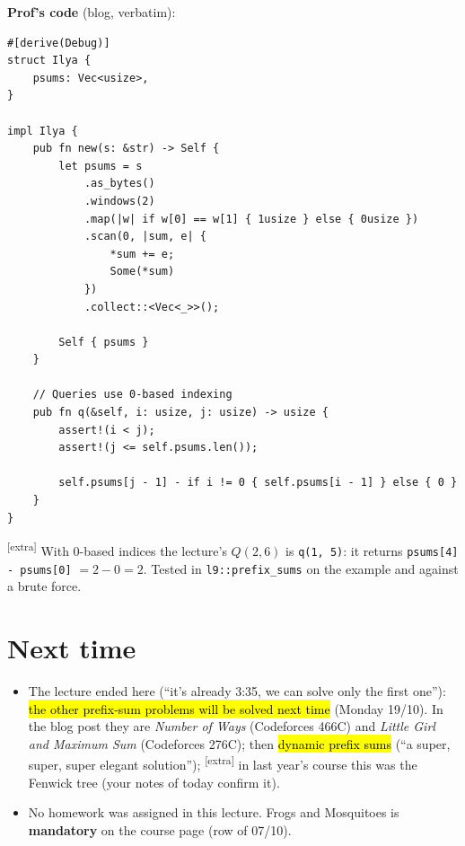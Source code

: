 \documentclass[11pt,a4paper]{article}
\theoremstyle{definition}\newtheorem*{definition}{Definition}
\newcommand{\hly}[1]{{\sethlcolor{hlY}\hl{#1}}}
\newcommand{\extra}{\textsuperscript{\textcolor{warn}{[extra]}}}
\begin{document}
\noindent\textbf{Prof's code} (blog, verbatim):
\begin{lstlisting}
#[derive(Debug)]
struct Ilya {
    psums: Vec<usize>,
}

impl Ilya {
    pub fn new(s: &str) -> Self {
        let psums = s
            .as_bytes()
            .windows(2)
            .map(|w| if w[0] == w[1] { 1usize } else { 0usize })
            .scan(0, |sum, e| {
                *sum += e;
                Some(*sum)
            })
            .collect::<Vec<_>>();

        Self { psums }
    }

    // Queries use 0-based indexing
    pub fn q(&self, i: usize, j: usize) -> usize {
        assert!(i < j);
        assert!(j <= self.psums.len());

        self.psums[j - 1] - if i != 0 { self.psums[i - 1] } else { 0 }
    }
}
\end{lstlisting}
\extra{} With 0-based indices the lecture's $Q(2,6)$ is \texttt{q(1, 5)}: it returns \texttt{psums[4] - psums[0]} $=2-0=2$. Tested in \texttt{l9::prefix\_sums} on the
example and against a brute force.

\section{Next time}
\begin{itemize}[nosep]
\item The lecture ended here (``it's already 3:35, we can solve only the first one''): \hly{the other prefix-sum problems will be solved next time} (Monday 19/10).
      In the blog post they are \emph{Number of Ways} (Codeforces 466C) and \emph{Little Girl and Maximum Sum} (Codeforces 276C); then
      \hly{dynamic prefix sums} (``a super, super, super elegant solution''); \extra{} in last year's course this was the Fenwick tree (your notes of today confirm it).
\item No homework was assigned in this lecture. Frogs and Mosquitoes is \textbf{mandatory} on the course page (row of 07/10).
\end{itemize}
\end{document}
